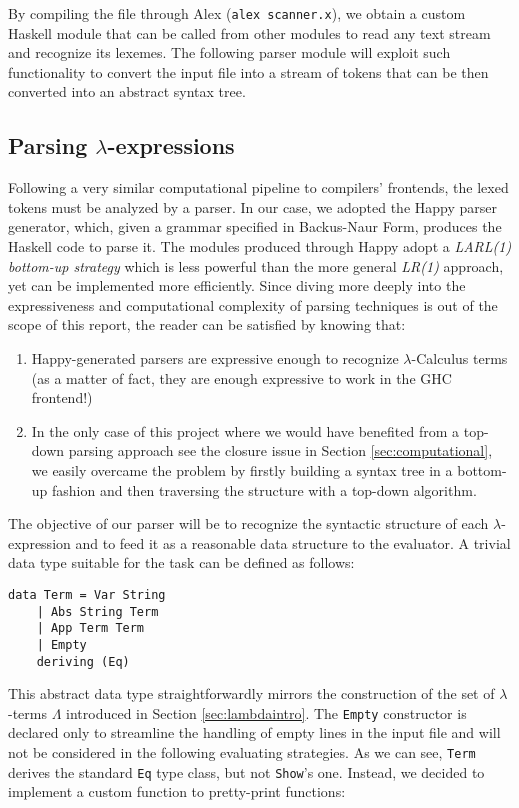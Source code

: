 \documentclass{article}
\begin{document}
By compiling the file through Alex (\lstinline|alex scanner.x|), we obtain a custom Haskell module that can be called from other modules to read any text stream and recognize its lexemes. The following parser module will exploit such functionality to convert the input file into a stream of tokens that can be then converted into an abstract syntax tree.

\subsection{Parsing $\lambda$-expressions}

Following a very similar computational pipeline to compilers' frontends, the lexed tokens must be analyzed by a parser. In our case, we adopted the Happy parser generator, which, given a grammar specified in Backus-Naur Form, produces the Haskell code to parse it. The modules produced through Happy adopt a \textit{LARL(1) bottom-up strategy} which is less powerful than the more general \textit{LR(1)} approach, yet can be implemented more efficiently. Since diving more deeply into the expressiveness and computational complexity of parsing techniques is out of the scope of this report, the reader can be satisfied by knowing that:

\begin{enumerate}
    \item Happy-generated parsers are expressive enough to recognize $\lambda$-Calculus terms (as a matter of fact, they are enough expressive to work in the GHC frontend!)
    \item In the only case of this project where we would have benefited from a top-down parsing approach {see the closure issue in Section \ref{sec:computational}}, we easily overcame the problem by firstly building a syntax tree in a bottom-up fashion and then traversing the structure with a top-down algorithm.
\end{enumerate}

The objective of our parser will be to recognize the syntactic structure of each $\lambda$-expression and to feed it as a reasonable data structure to the evaluator. A trivial data type suitable for the task can be defined as follows:

\begin{lstlisting}
data Term = Var String
    | Abs String Term
    | App Term Term
    | Empty
    deriving (Eq)
\end{lstlisting}

This abstract data type straightforwardly mirrors the construction of the set of $\lambda$-terms $\Lambda$ introduced in Section \ref{sec:lambdaintro}. The \lstinline|Empty| constructor is declared only to streamline the handling of empty lines in the input file and will not be considered in the following evaluating strategies. As we can see, \lstinline|Term| derives the standard \lstinline|Eq| type class, but not \lstinline|Show|'s one. Instead, we decided to implement a custom function to pretty-print functions:
\end{document}
